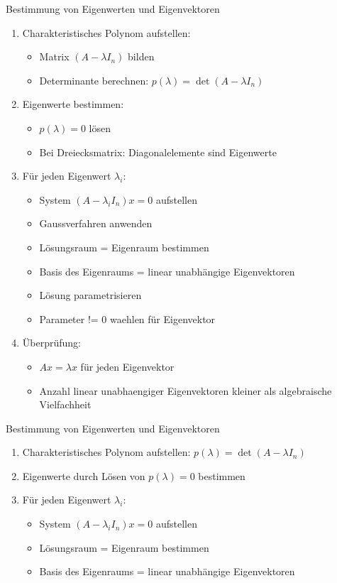 \begin{KR}{Bestimmung von Eigenwerten und Eigenvektoren}
\begin{enumerate}
    \item Charakteristisches Polynom aufstellen: 
    \begin{itemize}
        \item Matrix $(A-\lambda I_n)$ bilden
        \item Determinante berechnen: $p(\lambda) = \det(A-\lambda I_n)$
    \end{itemize}
    \item Eigenwerte bestimmen:
    \begin{itemize}
        \item $p(\lambda) = 0$ lösen
        \item Bei Dreiecksmatrix: Diagonalelemente sind Eigenwerte
    \end{itemize}
    \item Für jeden Eigenwert $\lambda_i$:
    \begin{itemize}
        \item System $(A-\lambda_i I_n)x = 0$ aufstellen
        \item Gaussverfahren anwenden 
        \item Lösungsraum = Eigenraum bestimmen
        \item Basis des Eigenraums = linear unabhängige Eigenvektoren
        \item Lösung parametrisieren
        \item Parameter != 0 waehlen für Eigenvektor
    \end{itemize}
    \item Überprüfung:
    \begin{itemize}
        \item $Ax = \lambda x$ für jeden Eigenvektor
        \item Anzahl linear unabhaengiger Eigenvektoren kleiner als algebraische Vielfachheit
    \end{itemize}
\end{enumerate}
\end{KR}

\begin{KR}{Bestimmung von Eigenwerten und Eigenvektoren}
\begin{enumerate}
    \item Charakteristisches Polynom aufstellen: $p(\lambda) = \det(A-\lambda I_n)$
    \item Eigenwerte durch Lösen von $p(\lambda) = 0$ bestimmen
    \item Für jeden Eigenwert $\lambda_i$:
        \begin{itemize}
            \item System $(A-\lambda_i I_n)x = 0$ aufstellen
            \item Lösungsraum = Eigenraum bestimmen
            \item Basis des Eigenraums = linear unabhängige Eigenvektoren
        \end{itemize}
\end{enumerate}
\end{KR}

